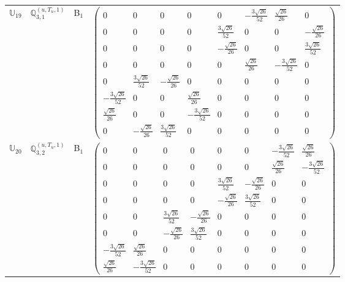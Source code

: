 \documentclass[fleqn,10pt,landscape]{article}
\begin{document}
\begin{itemize}
\begin{center}
\begin{longtable}{c|c|c|c}
$ \mathbb{U}_{19} $ & $\mathbb{Q}_{3,1}^{(u,T_{u},1)}$ & B$_{1}$ & $\begin{pmatrix} 0 & 0 & 0 & 0 & 0 & - \frac{3 \sqrt{26}}{52} & \frac{\sqrt{26}}{26} & 0 \\ 0 & 0 & 0 & 0 & \frac{3 \sqrt{26}}{52} & 0 & 0 & - \frac{\sqrt{26}}{26} \\ 0 & 0 & 0 & 0 & - \frac{\sqrt{26}}{26} & 0 & 0 & \frac{3 \sqrt{26}}{52} \\ 0 & 0 & 0 & 0 & 0 & \frac{\sqrt{26}}{26} & - \frac{3 \sqrt{26}}{52} & 0 \\ 0 & \frac{3 \sqrt{26}}{52} & - \frac{\sqrt{26}}{26} & 0 & 0 & 0 & 0 & 0 \\ - \frac{3 \sqrt{26}}{52} & 0 & 0 & \frac{\sqrt{26}}{26} & 0 & 0 & 0 & 0 \\ \frac{\sqrt{26}}{26} & 0 & 0 & - \frac{3 \sqrt{26}}{52} & 0 & 0 & 0 & 0 \\ 0 & - \frac{\sqrt{26}}{26} & \frac{3 \sqrt{26}}{52} & 0 & 0 & 0 & 0 & 0 \end{pmatrix}$ \\
$ \mathbb{U}_{20} $ & $\mathbb{Q}_{3,2}^{(u,T_{u},1)}$ & B$_{1}$ & $\begin{pmatrix} 0 & 0 & 0 & 0 & 0 & 0 & - \frac{3 \sqrt{26}}{52} & \frac{\sqrt{26}}{26} \\ 0 & 0 & 0 & 0 & 0 & 0 & \frac{\sqrt{26}}{26} & - \frac{3 \sqrt{26}}{52} \\ 0 & 0 & 0 & 0 & \frac{3 \sqrt{26}}{52} & - \frac{\sqrt{26}}{26} & 0 & 0 \\ 0 & 0 & 0 & 0 & - \frac{\sqrt{26}}{26} & \frac{3 \sqrt{26}}{52} & 0 & 0 \\ 0 & 0 & \frac{3 \sqrt{26}}{52} & - \frac{\sqrt{26}}{26} & 0 & 0 & 0 & 0 \\ 0 & 0 & - \frac{\sqrt{26}}{26} & \frac{3 \sqrt{26}}{52} & 0 & 0 & 0 & 0 \\ - \frac{3 \sqrt{26}}{52} & \frac{\sqrt{26}}{26} & 0 & 0 & 0 & 0 & 0 & 0 \\ \frac{\sqrt{26}}{26} & - \frac{3 \sqrt{26}}{52} & 0 & 0 & 0 & 0 & 0 & 0 \end{pmatrix}$ \\

\end{longtable}
\end{center}
\end{itemize}
\end{document}

